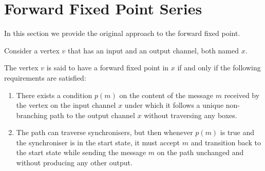 %
%
%
%



    \section{Forward Fixed Point Series\label{ffp}}
In this section we provide the original approach to the forward fixed point.


Consider a vertex $v$ that has an input and an output channel, both named $x$.

\begin{definition}The vertex $v$ is said to have a forward fixed point in $x$ if and only if the following requirements are satisfied:

\begin{enumerate}
\item There exists a condition $p(m)$ on the content of the message $m$ received by the vertex on the input channel $x$ under which it follows a unique non-branching path to the output channel $x$ without traversing any boxes.

\item The path can traverse synchronisers, but then whenever $p(m)$ is true and the synchroniser is in the start state, it must accept $m$ and transition back to the start state while sending the message $m$ on the path unchanged and without producing any other output.

\end{enumerate}
\end{definition}

